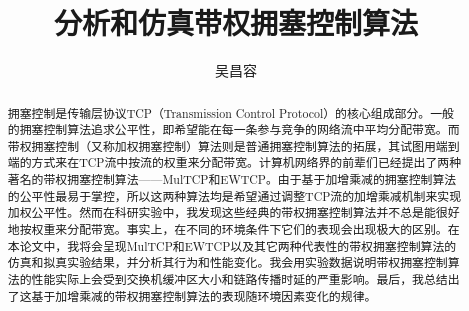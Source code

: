 \documentclass[winfonts]{njuthesis}
\title{分析和仿真带权拥塞控制算法}
\author{吴昌容}
\begin{document}
\maketitle

\begin{abstract}
  拥塞控制是传输层协议TCP（Transmission Control Protocol）的核心组成部分。一般的拥塞控制算法追求公平性，即希望能在每一条参与竞争的网络流中平均分配带宽。而带权拥塞控制（又称加权拥塞控制）算法则是普通拥塞控制算法的拓展，其试图用端到端的方式来在TCP流中按流的权重来分配带宽。计算机网络界的前辈们已经提出了两种著名的带权拥塞控制算法——MulTCP和EWTCP。由于基于加增乘减的拥塞控制算法的公平性最易于掌控，所以这两种算法均是希望通过调整TCP流的加增乘减机制来实现加权公平性。然而在科研实验中，我发现这些经典的带权拥塞控制算法并不总是能很好地按权重来分配带宽。事实上，在不同的环境条件下它们的表现会出现极大的区别。在本论文中，我将会呈现MulTCP和EWTCP以及其它两种代表性的带权拥塞控制算法的仿真和拟真实验结果，并分析其行为和性能变化。我会用实验数据说明带权拥塞控制算法的性能实际上会受到交换机缓冲区大小和链路传播时延的严重影响。最后，我总结出了这基于加增乘减的带权拥塞控制算法的表现随环境因素变化的规律。
\end{abstract}
\end{document}
